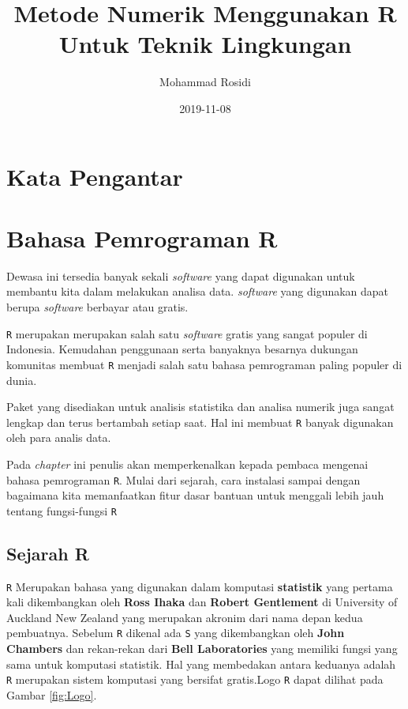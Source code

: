 \documentclass[]{book}
\title{Metode Numerik Menggunakan R Untuk Teknik Lingkungan}
\author{Mohammad Rosidi}
\date{2019-11-08}
\theoremstyle{definition}
\theoremstyle{definition}
\theoremstyle{definition}
\theoremstyle{remark}
\begin{document}
\maketitle

{
\setcounter{tocdepth}{1}
\tableofcontents
}
\hypertarget{kata-pengantar}{%
\chapter*{Kata Pengantar}\label{kata-pengantar}}

\hypertarget{intro}{%
\chapter{Bahasa Pemrograman R}\label{intro}}

Dewasa ini tersedia banyak sekali \emph{software} yang dapat digunakan untuk membantu kita dalam melakukan analisa data. \emph{software} yang digunakan dapat berupa \emph{software} berbayar atau gratis.

\texttt{R} merupakan merupakan salah satu \emph{software} gratis yang sangat populer di Indonesia. Kemudahan penggunaan serta banyaknya besarnya dukungan komunitas membuat \texttt{R} menjadi salah satu bahasa pemrograman paling populer di dunia.

Paket yang disediakan untuk analisis statistika dan analisa numerik juga sangat lengkap dan terus bertambah setiap saat. Hal ini membuat \texttt{R} banyak digunakan oleh para analis data.

Pada \emph{chapter} ini penulis akan memperkenalkan kepada pembaca mengenai bahasa pemrograman \texttt{R}. Mulai dari sejarah, cara instalasi sampai dengan bagaimana kita memanfaatkan fitur dasar bantuan untuk menggali lebih jauh tentang fungsi-fungsi \texttt{R}

\hypertarget{sejarahR}{%
\section{Sejarah R}\label{sejarahR}}

\texttt{R} Merupakan bahasa yang digunakan dalam komputasi \textbf{statistik} yang pertama kali dikembangkan oleh \textbf{Ross Ihaka} dan \textbf{Robert Gentlement} di University of Auckland New Zealand yang merupakan akronim dari nama depan kedua pembuatnya. Sebelum \texttt{R} dikenal ada \texttt{S} yang dikembangkan oleh \textbf{John Chambers} dan rekan-rekan dari \textbf{Bell Laboratories} yang memiliki fungsi yang sama untuk komputasi statistik. Hal yang membedakan antara keduanya adalah \texttt{R} merupakan sistem komputasi yang bersifat gratis.Logo \texttt{R} dapat dilihat pada Gambar \ref{fig:Logo}.
\end{document}
